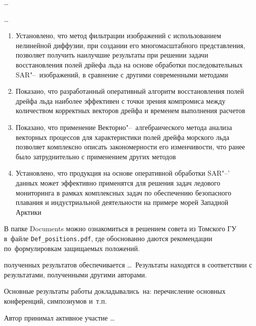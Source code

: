 {\influence} \ldots

{\methods} \ldots

{}
\begin{enumerate}
  \item Установлено, что метод фильтрации изображений с использованием нелинейной диффузии, при создании его многомасштабного представления,  позволяет получить наилучшие результаты при решении задачи восстановления полей дрйефа льда на основе обработки последовательных SAR"--~изображений, в сравнение с другими современными методами
  \item Показано, что разработанный оперативный алгоритм восстановления полей дрейфа льда наиболее эффективен с точки зрения компромиса между количеством корректных векторов дрейфа и временем выполнения расчетов
  \item Показано, что применение Векторно"--~алгебраического метода анализа векторных процессов для характеристики полей дрейфа морского льда позволяет комплексно описать закономерности его изменчивости, что ранее было затруднительно с применением других методов
  \item Установлено, что продукция на основе оперативной обработки SAR"--' данных может эффективно применятся для решения задач ледового мониторинга в рамках комплексных задач по обеспечению безопасного плавания и индустриальной деятельности на примере морей Западной Арктики
\end{enumerate}
В папке Documents можно ознакомиться в решением совета из Томского ГУ
в~файле \verb+Def_positions.pdf+, где обоснованно даются рекомендации
по~формулировкам защищаемых положений. 

{\reliability} полученных результатов обеспечивается \ldots \ Результаты находятся в соответствии с результатами, полученными другими авторами.


{\probation}
Основные результаты работы докладывались~на:
перечисление основных конференций, симпозиумов и~т.\:п.

{\contribution} Автор принимал активное участие \ldots


